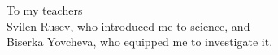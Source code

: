 \thispagestyle{empty}
{}

\vspace*{3cm}

\begin{center}
    To my teachers \\[2pt]
    Svilen Rusev, who introduced me to science, and \\ %
    Biserka Yovcheva, who equipped me to investigate it.



\end{center}

\medskip

